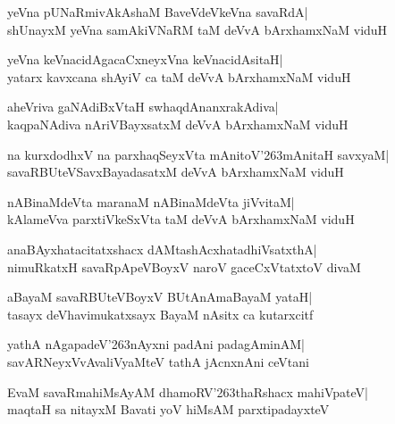 \documentclass[twoside,12pt,openright]{book}
\def\S{\char'263}
\newcounter{shloka}[chapter]
\begin{document}
\begin{shloka}%
yeVna pUNaRmivAkAshaM BaveVdeVkeVna savaRdA|\\
shUnayxM yeVna samAkiVNaRM taM deVvA bArxhamxNaM viduH
\end{shloka}

\begin{shloka}%
yeVna keVnacidAgacaCxneyxVna keVnacidAsitaH|\\
yatarx kavxcana shAyiV ca taM deVvA bArxhamxNaM viduH
\end{shloka}

\begin{shloka}%
aheVriva gaNAdiBxVtaH swhaqdAnanxrakAdiva|\\
kaqpaNAdiva nAriVBayxsatxM deVvA bArxhamxNaM viduH
\end{shloka}

\begin{shloka}%
na kurxdodhxV na parxhaqSeyxVta mAnitoV\S mAnitaH savxyaM|\\
savaRBUteVSavxBayadasatxM deVvA bArxhamxNaM viduH
\end{shloka}

\begin{shloka}%
nABinaMdeVta maranaM nABinaMdeVta jiVvitaM|\\
kAlameVva parxtiVkeSxVta taM deVvA bArxhamxNaM viduH
\end{shloka}

\begin{shloka}%
anaBAyxhatacitatxshacx dAMtashAcxhatadhiVsatxthA|\\
nimuRkatxH savaRpApeVBoyxV naroV gaceCxVtatxtoV divaM
\end{shloka}

\begin{shloka}%
aBayaM savaRBUteVBoyxV BUtAnAmaBayaM yataH|\\
tasayx deVhavimukatxsayx BayaM nAsitx ca kutarxcitf
\end{shloka}

\begin{shloka}%
yathA nAgapadeV\S nAyxni padAni padagAminAM|\\
savARNeyxVvAvaliVyaMteV tathA jAcnxnAni ceVtani
\end{shloka}

\begin{shloka}%
EvaM savaRmahiMsAyAM dhamoRV\S thaRshacx mahiVpateV|\\
maqtaH sa nitayxM Bavati yoV hiMsAM parxtipadayxteV
\end{shloka}
\end{document}

